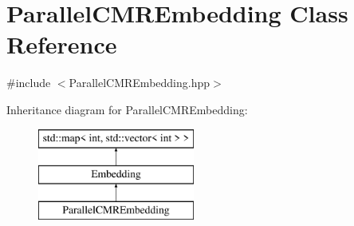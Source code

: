 \hypertarget{a00092}{}\section{Parallel\+C\+M\+R\+Embedding Class Reference}
\label{a00092}


{\ttfamily \#include $<$Parallel\+C\+M\+R\+Embedding.\+hpp$>$}

Inheritance diagram for Parallel\+C\+M\+R\+Embedding\+:\begin{figure}[H]
\begin{center}
\leavevmode
\includegraphics[height=3.000000cm]{a00092}
\end{center}
\end{figure}

